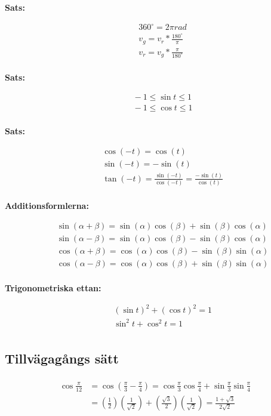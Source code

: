 \newpage

\textbf{Sats:}\par
\begin{align*}
  &\quad 360^\circ = 2\pi rad \\
  &\quad v_{g} = v_{r} * \frac{180^\circ}{\pi} \\
  &\quad v_{r} = v_{g} * \frac{\pi}{180^\circ} \\
\end{align*}

\textbf{Sats:}\par
\begin{align*}
  &\quad -1 \leq \sin{t} \leq 1 \\
  &\quad -1 \leq \cos{t} \leq 1 \\
\end{align*}

\textbf{Sats:}\par
\begin{align*}
  &\quad \cos{(-t)} = \cos{(t)} \\
  &\quad \sin{(-t)} = -\sin{(t)} \\
  &\quad \tan{(-t)} = \frac{\sin{(-t)}}{\cos{(-t)}} = \frac{-\sin{(t)}}{\cos{(t)}} \\
\end{align*}

\textbf{Additionsformlerna:}\par
\begin{align*}
  &\quad \sin{(\alpha + \beta)} = \sin{(\alpha)}\cos{(\beta)} + \sin{(\beta)}\cos{(\alpha)} \\
  &\quad \sin{(\alpha - \beta)} = \sin{(\alpha)}\cos{(\beta)} - \sin{(\beta)}\cos{(\alpha)} \\
  &\quad \cos{(\alpha + \beta)} = \cos{(\alpha)}\cos{(\beta)} - \sin{(\beta)}\sin{(\alpha)} \\
  &\quad \cos{(\alpha - \beta)} = \cos{(\alpha)}\cos{(\beta)} + \sin{(\beta)}\sin{(\alpha)} \\ 
\end{align*}

\textbf{Trigonometriska ettan:}\par
\begin{align*}
  &\quad (\sin{t})^{2} + (\cos{t})^{2} = 1 \\
  &\quad \sin^{2}{t} + \cos^{2}{t} = 1 \\ 
\end{align*}


\subsection{Tillvägagångs sätt}
\begin{align*}
  \begin{aligned} \cos \frac { \pi } { 12 } & = \cos \left( \frac { \pi } { 3 } - \frac { \pi } { 4 } \right) = \cos \frac { \pi } { 3 } \cos \frac { \pi } { 4 } + \sin \frac { \pi } { 3 } \sin \frac { \pi } { 4 } \\ & = \left( \frac { 1 } { 2 } \right) \left( \frac { 1 } { \sqrt { 2 } } \right) + \left( \frac { \sqrt { 3 } } { 2 } \right) \left( \frac { 1 } { \sqrt { 2 } } \right) = \frac { 1 + \sqrt { 3 } } { 2 \sqrt { 2 } } \end{aligned}
\end{align*}
